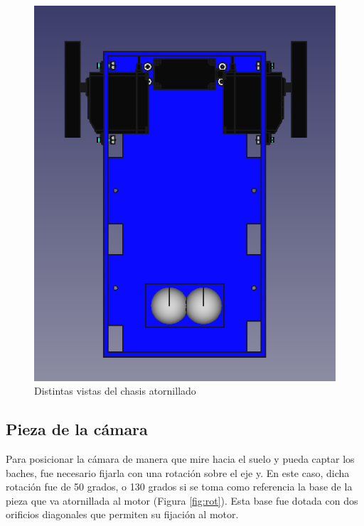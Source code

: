 \begin{figure}[ht!]
\begin{minipage}{0.45\linewidth}
		\includegraphics[width=\linewidth]{figs/cap5/basecon2.png}
		\caption*{\centering}
	\end{minipage}
	\caption{Distintas vistas del chasis atornillado}
	\label{fig:pbasemontada}
\end{figure}

\subsection{Pieza de la cámara}

Para posicionar la cámara de manera que mire hacia el suelo y pueda captar los baches, fue necesario fijarla con una rotación sobre el eje y. En este caso, dicha rotación fue de 50 grados, o 130 grados si se toma como referencia la base de la pieza que va atornillada al motor (Figura \ref{fig:rot}). Esta base fue dotada con dos orificios diagonales que permiten su fijación al motor.


